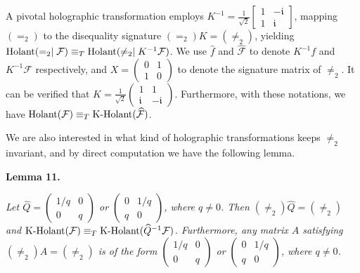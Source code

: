 A pivotal holographic transformation employs $K^{-1}=\frac{1}{\sqrt{2}}\begin{bmatrix}1&-\mathfrak{i}\\
1&\mathfrak{i}\end{bmatrix}$, mapping $(=_{2})$ to the disequality signature $(=_{2})K=(\neq_{2})$, yielding $\textup{{Holant}}(=_{2}\mid\mathcal{F})\equiv_{T}\textup{{Holant}}(\neq_{2}\mid K^{-1}\mathcal{F})$. We use $\widehat{f}$ and $\widehat{\mathcal{F}}$ to denote $K^{-1}f$ and $K^{-1}\mathcal{F}$ respectively, and $X=\begin{pmatrix}0&1\\
1&0\end{pmatrix}$ to denote the signature matrix of $\neq_{2}$. It can be verified that $K=\frac{1}{\sqrt{2}}\left(\begin{matrix}1&1\\
\mathfrak{i}&-\mathfrak{i}\end{matrix}\right)$. Furthermore, with these notations, we have $\textup{{Holant}}(\mathcal{F})\equiv_{T}\textup{{K-Holant}}(\widehat{\mathcal{F}})$.\par




We are also interested in what kind of holographic transformations keeps $\neq_{2}$ invariant, and by direct computation we have the following lemma.\par





\par\medskip\noindent\textbf{
\textbf{Lemma 11}\textbf{.}
}\par



\emph{Let $\widehat{Q}=\begin{pmatrix}1/q&0\\
0&q\end{pmatrix}$ or $\begin{pmatrix}0&1/q\\
q&0\end{pmatrix}$, where $q\neq 0$. Then $(\neq_{2})\widehat{Q}=(\neq_{2})$ and $\textup{{K-Holant}}(\mathcal{F})\equiv_{T}\textup{{K-Holant}}(\widehat{Q}^{-1}\mathcal{F})$. Furthermore, any matrix $A$ satisfying $(\neq_{2})A=(\neq_{2})$ is of the form $\begin{pmatrix}1/q&0\\
0&q\end{pmatrix}$ or $\begin{pmatrix}0&1/q\\
q&0\end{pmatrix}$, where $q\neq 0$.}\par



